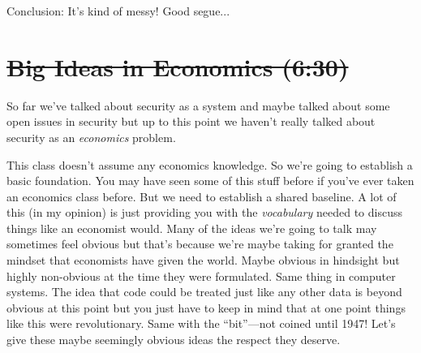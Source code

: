 \documentclass[11pt]{article}
\begin{document}
Conclusion: It's kind of messy! Good segue...





\section{\sout{Big Ideas in Economics (6:30)}}

So far we've talked about security as a system and maybe talked about some open issues in security but up to this point we haven't really talked about security as an {\it economics} problem.

This class doesn't assume any economics knowledge. So we're going to establish a basic foundation.
You may have seen some of this stuff before if you've ever taken an economics class before.
But we need to establish a shared baseline. A lot of this (in my opinion) is just providing you with the {\it vocabulary} needed to discuss things like an economist would. Many of the ideas we're going to talk may sometimes feel obvious but that's because we're maybe taking for granted the mindset that economists have given the world. Maybe obvious in hindsight but highly non-obvious at the time they were formulated. Same thing in computer systems. The idea that code could be treated just like any other data is beyond obvious at this point but you just have to keep in mind that at one point things like this were revolutionary. Same with the ``bit''---not coined until 1947! Let's give these maybe seemingly obvious ideas the respect they deserve.
\end{document}
